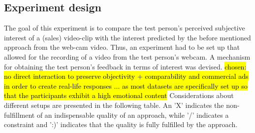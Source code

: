 \subsection{Experiment design}
The goal of this experiment is to compare the test person's perceived subjective interest of a (sales) video-clip with the interest predicted by the before mentioned approach from the web-cam video. Thus, an experiment had to be set up that allowed for the recording of a video from the test person's webcam. A mechanism for obtaining the test person's feedback in terms of interest was devised.
\newline\newline
\hl{chosen: no direct interaction to preserve objectivity + comparability   and commercial ads in order to create real-life responses    ... as most datasets are specifically set up so that the participants exhibit a high emotional content}
\newline\newline
Considerations about different setups are presented in the following table. An 'X' indicates the non-fulfillment of an indispensable quality of an approach, while '/' indicates a constraint and ':)' indicates that the quality is fully fulfilled by the approach.

